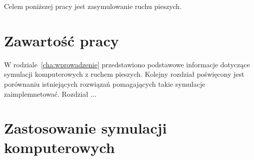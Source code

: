 Celem poniższej pracy jest zasymulowanie ruchu pieszych.


\section{Zawartość pracy}
\label{sec:zawartoscPracy}

W rodziale~\ref{cha:wprowadzenie} przedstawiono podstawowe informacje dotyczące symulacji komputerowych z ruchem pieszych. Kolejny rozdział poświęcony jest porównaniu istniejących rozwiązań pomagających takie symulacje zaimplemnetować. Rozdział ...

\section{Zastosowanie symulacji komputerowych}
\label{sec:ZastosowanieSymulacji}


















